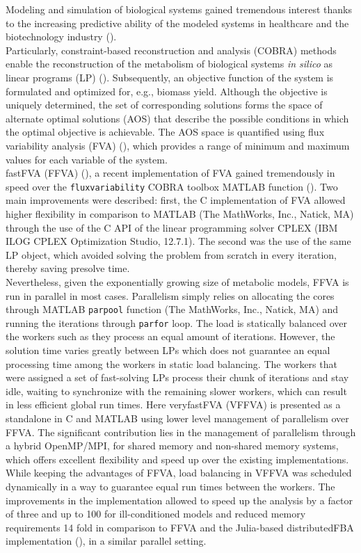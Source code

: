 \documentclass{bioinfo}
\begin{document}
Modeling and simulation of biological systems gained tremendous interest thanks to the increasing predictive ability of the modeled systems in healthcare and the biotechnology industry (\citealp{gottstein2016constraint}). \\
Particularly, constraint-based reconstruction and analysis (COBRA) methods enable the reconstruction of the metabolism of biological systems \textit{in silico} as linear programs (LP) (\citealp{o2015using}). Subsequently, an objective function of the system is formulated and optimized for, e.g., biomass yield. Although the objective is uniquely determined, the set of corresponding solutions forms the space of alternate optimal solutions (AOS) that describe the possible conditions in which the optimal objective is achievable. The AOS space is quantified using flux variability analysis (FVA) (\citealp{mahadevan2003effects}), which provides a range of minimum and maximum values for each variable of the system.\\
fastFVA (FFVA) (\citealp{gudmundsson2010computationally}), a recent implementation of FVA gained tremendously in speed over the \texttt{fluxvariability} COBRA toolbox MATLAB function (\citealp{heirendt2017creation}). Two main improvements were described: first, the C implementation of FVA allowed higher flexibility in comparison to MATLAB (The MathWorks, Inc., Natick, MA) through the use of the C API of the linear programming solver CPLEX (IBM ILOG CPLEX Optimization Studio, 12.7.1). The second was the use of the same LP object, which avoided solving the problem from scratch in every iteration, thereby saving presolve time.\\
Nevertheless, given the exponentially growing size of metabolic models, FFVA is run in parallel in most cases. Parallelism simply relies on allocating the cores through MATLAB \texttt{parpool} function (The MathWorks, Inc., Natick, MA) and running the iterations through \texttt{parfor} loop. The load is statically balanced over the workers such as they process an equal amount of iterations. However, the solution time varies greatly between LPs which does not guarantee an equal processing time among the workers in static load balancing. The workers that were assigned a set of fast-solving LPs process their chunk of iterations and stay idle, waiting to synchronize with the remaining slower workers, which can result in less efficient global run times.
Here veryfastFVA (VFFVA) is presented as a standalone in C and MATLAB using lower level management of parallelism over FFVA. The significant contribution lies in the management of parallelism through a hybrid OpenMP/MPI, for shared memory and non-shared memory systems, which offers excellent flexibility and speed up over the existing implementations. While keeping the advantages of FFVA, load balancing in VFFVA was scheduled dynamically in a way to guarantee equal run times between the workers. The improvements in the implementation allowed to speed up the analysis by a factor of three and up to 100 for ill-conditioned models and reduced memory requirements 14 fold in comparison to FFVA and the Julia-based distributedFBA implementation (\citealp{heirendt2016distributedfba}), in a similar parallel setting.\\
\end{document}
